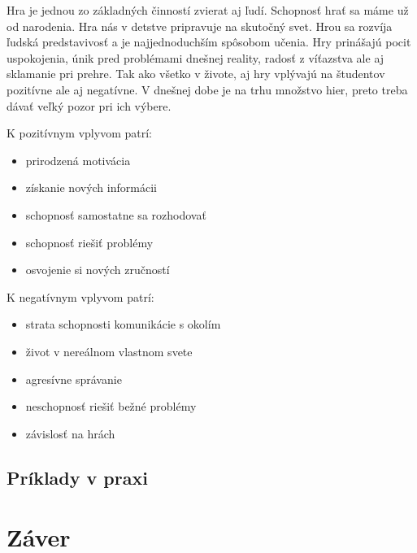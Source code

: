 \documentclass[10pt,twoside,slovak,a4paper]{article}
\begin{document}
Hra je jednou zo základných činností zvierat aj ľudí. Schopnosť hrať sa máme už od narodenia. Hra nás v detstve pripravuje na skutočný svet. Hrou sa rozvíja ľudská predstavivosť a je najjednoduchším spôsobom učenia. Hry prinášajú pocit uspokojenia, únik pred problémami dnešnej reality, radosť z víťazstva ale aj sklamanie pri prehre.  Tak ako všetko v živote, aj hry vplývajú na študentov pozitívne ale aj negatívne. V dnešnej dobe je na trhu množstvo hier, preto treba dávať veľký pozor pri ich výbere.

\vspace{5mm}
K pozitívnym vplyvom patrí: 

\begin{itemize}
\item prirodzená motivácia
\item získanie nových informácii
\item schopnosť samostatne sa rozhodovať
\item schopnosť riešiť problémy
\item osvojenie si nových zručností
\end{itemize}

\vspace{5mm}
K negatívnym vplyvom patrí: 

\begin{itemize}
\item strata schopnosti komunikácie s okolím
\item život v nereálnom vlastnom svete
\item agresívne správanie
\item neschopnosť riešiť bežné problémy
\item závislosť na hrách
\end{itemize}

\subsection{Príklady v praxi} \label{Prax}


\section{Záver}





\end{document}
